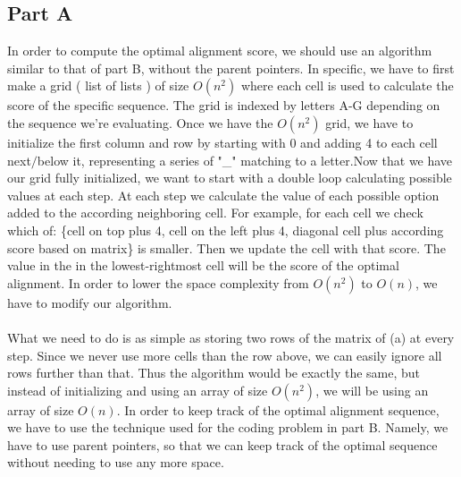 \documentclass[12pt,twoside]{article}
\begin{document}

\begin{problems}

\section*{Part A}

\problem  %

\begin{problemparts}
\problempart In order to compute the optimal alignment score, we should use an algorithm similar to that of part B, without the parent pointers. In specific, we have to first make a grid ( list of lists ) of size $O ( n^2 ) $ where each cell is used to calculate the score of the specific sequence. The grid is indexed by letters A-G depending on the sequence we're evaluating. Once we have the $O(n^2)$ grid, we have to initialize the first column and row by starting with 0 and adding 4 to each cell next$/$below it, representing a series of "\_" matching to a letter.Now that we have our grid fully initialized, we want to start with a double loop calculating possible values at each step. At each step we calculate the value of each possible option added to the according neighboring cell. For example, for each cell we check which of: \{cell on top plus 4, cell on the left plus 4, diagonal cell plus according score based on matrix\} is smaller. Then we update the cell with that score. The value in the in the lowest-rightmost cell will be the score of the optimal alignment.  
\problempart 
In order to lower the space complexity from $O(n^2)$ to $O(n)$, we have to modify our algorithm. 
\\\\ What we need to do is as simple as storing two rows of the matrix of (a) at every step. Since we never use more cells than the row above, we can easily ignore all rows further than that. Thus the algorithm would be exactly the same, but instead of initializing and using an array of size $O(n^2)$, we will be using an array of size $O(n)$. 
\problempart
In order to keep track of the optimal alignment sequence, we have to use the technique used for the coding problem in part B. Namely, we have to use parent pointers, so that we can keep track of the optimal sequence without needing to use any more space. 

\end{problemparts}
\end{problems}
\end{document}
